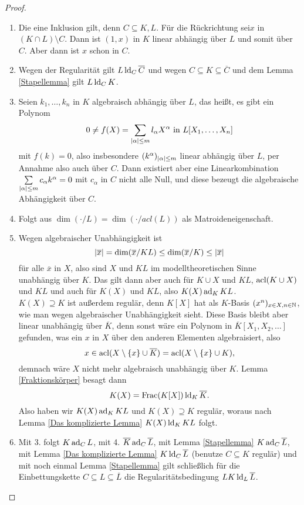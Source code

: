     \begin{proof}
    	\ 
    	\begin{enumerate}
    		\item Die eine Inklusion gilt, denn $C\subseteq K,L$. Für die Rückrichtung sei\linebreak$x$ in $(K\cap L)\setminus C$. Dann ist $(1,x)$ in $K$ linear abhängig über $L$ und somit über $C$. Aber dann ist $x$ schon in $C$.
    		\item Wegen der Regularität gilt $L\operatorname{ld}_C\overline{C}$ und wegen $C\subseteq K\subseteq\overline{C}$ und dem Lemma \ref{Stapellemma} gilt $L\operatorname{ld}_C K$.
    		\item Seien $k_1,\dots,k_n$ in $K$ algebraisch abhängig über $L$, das heißt, es gibt ein Polynom $$0\neq f(X)=\sum\limits_{{\left| \alpha \right|}\leq m}l_\alpha X^\alpha\text{ in }L[X_1,\dots,X_n]$$ mit $f(k)=0$, also insbesondere $(k^\alpha)_{{\left| \alpha \right|}\leq m}$ linear abhängig über $L$, per Annahme also auch über $C$. Dann existiert aber eine Linearkombination $\sum\limits_{{\left| \alpha \right|}\leq m}c_\alpha k^\alpha=0$ mit $c_\alpha$ in $C$ nicht alle Null, und diese bezeugt die algebraische Abhängigkeit über $C$.
    		\item Folgt aus $\dim(\cdot/L)=\dim(\cdot/acl(L))$ als Matroideneigenschaft.
    		\item Wegen algebraischer Unabhängigkeit ist $${\left| \overline{x} \right|}=\dim(\overline{x}/KL)\leq\dim(\overline{x}/K)\leq{\left| \overline{x} \right|}$$ für alle $\overline{x}$ in $X$, also sind $X$ und $KL$ im modelltheoretischen Sinne unabhängig über $K$. Das gilt dann aber auch für $K\cup X$ und $KL$, $\operatorname{acl}(K\cup X)$ und $KL$ und auch für $K(X)$ und $KL$, also $K(X)\operatorname{ad}_KKL$.\\
    		$K(X)\supseteq K$ ist außerdem regulär, denn $K[X]$ hat als $K$-Basis $(x^n)_{x\in X,n\in\mathbb{N}}$, wie man wegen algebraischer Unabhängigkeit sieht. Diese Basis bleibt aber linear unabhängig über $\overline{K}$, denn sonst wäre ein Polynom in $\overline{K}[X_1,X_2,\dots]$ gefunden, was ein $x$ in $X$ über den anderen Elementen algebraisiert, also $$x\in\operatorname{acl}(X\setminus\{x\}\cup\overline{K})=\operatorname{acl}(X\setminus\{x\}\cup K),$$ demnach wäre $X$ nicht mehr algebraisch unabhängig über $K$. Lemma \ref{Fraktionskörper} besagt dann $$K(X)=\operatorname{Frac}(K[X])\operatorname{ld}_K\overline{K}.$$
    		Also haben wir $K(X)\operatorname{ad}_KKL$ und $K(X)\supseteq K$ regulär, woraus nach Lemma \ref{Das komplizierte Lemma} $K(X)\operatorname{ld}_KKL$ folgt.
    		\item Mit 3. folgt $K\operatorname{ad}_CL$, mit 4. $\overline{K}\operatorname{ad}_C\overline{L}$, mit Lemma \ref{Stapellemma} $K\operatorname{ad}_C\overline{L}$, mit Lemma \ref{Das komplizierte Lemma} $K\operatorname{ld}_C\overline{L}$ (benutze $C\subseteq K$ regulär) und mit noch einmal Lemma \ref{Stapellemma} gilt schließlich für die Einbettungskette $C\subseteq L\subseteq\overline{L}$ die Regularitätsbedingung $LK\operatorname{ld}_L\overline{L}$.
    	\end{enumerate}
    \end{proof}
    \newpage
